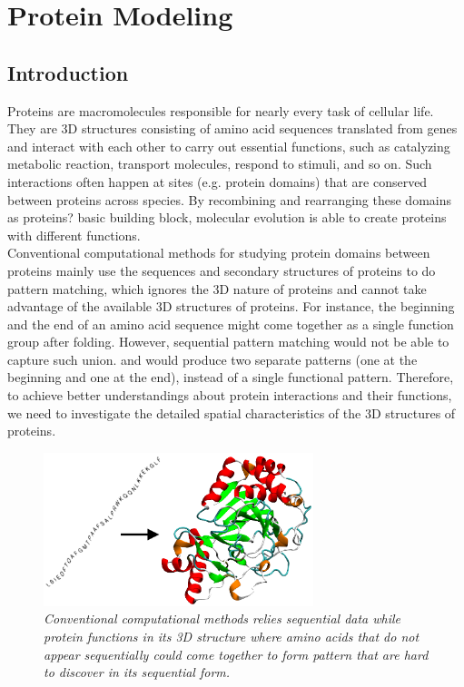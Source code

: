 \chapter{Protein Modeling}

\section{Introduction}

Proteins are macromolecules responsible for nearly every task of cellular life. They are 3D structures consisting of amino acid sequences translated from genes and interact with each other to carry out essential functions, such as catalyzing metabolic reaction, transport molecules, respond to stimuli, and so on. Such interactions often happen at sites (e.g. protein domains) that are conserved between proteins across species. By recombining and rearranging these domains as proteins? basic building block, molecular evolution is able to create proteins with different functions.\\

Conventional computational methods for studying protein domains between proteins mainly use the sequences and secondary structures of proteins to do pattern matching, which ignores the 3D nature of proteins and cannot take advantage of the available 3D structures of proteins. For instance, the beginning and the end of an amino acid sequence might come together as a single function group after folding. However, sequential pattern matching would not be able to capture such union. and would produce two separate patterns (one at the beginning and one at the end), instead of a single functional pattern. Therefore, to achieve better understandings about protein interactions and their functions, we need to investigate the detailed spatial characteristics of the 3D structures of proteins. \\

\begin{figure}[h]
	\centering
	\captionsetup{justification=centering}
	\includegraphics[width=0.7\textwidth]{figs/protein_folding.png}
	\caption[Caption for LOF]{\emph{Conventional computational methods relies sequential data while protein functions in its 3D structure where amino acids that do not appear sequentially could come together to form pattern that are hard to discover in its sequential form.}}
	\label{fig:protein_folding}
\end{figure}


